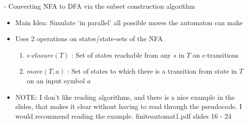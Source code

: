\documentclass[11pt]{article}
\begin{document}
- Converting NFA to DFA via the subset construction algorithm
\begin{itemize}
 \item Main Idea: Simulate `in parallel' all possible moves the automaton can make
 \item Uses 2 operations on states/state-sets of the NFA
 \begin{enumerate}
  \item $\epsilon$-$closure(T)$ : Set of states reachable from any $s$ in $T$ on $\epsilon$-transitions
  \item $move(T, a)$ : Set of states to which there is a transition from state in $T$ on an input symbol $a$
 \end{enumerate}
 \item NOTE: I don't like reading algorithms, and there is a nice example in the slides, that makes it clear without having to read through the pseudocode. I would recommend reading the example. finiteautomat1.pdf slides 16 - 24
\end{itemize}
\end{document}

